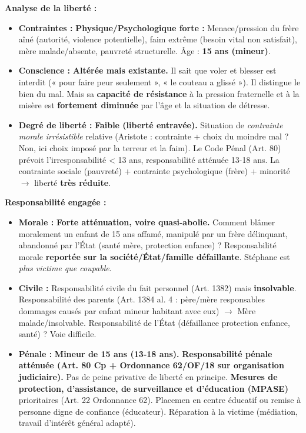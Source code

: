 \documentclass[11pt]{article}
\begin{document}
\begin{exoresolu}
\medskip
\noindent\textbf{Analyse de la liberté :}
\begin{itemize}
    \item \textbf{Contraintes :} \textbf{Physique/Psychologique forte :} Menace/pression du frère aîné (autorité, violence potentielle), faim extrême (besoin vital non satisfait), mère malade/absente, pauvreté structurelle. Âge : \textbf{15 ans (mineur)}.
    \item \textbf{Conscience :} \textbf{Altérée mais existante.} Il sait que voler et blesser est interdit (« pour faire peur seulement », « le couteau a glissé »). Il distingue le bien du mal. Mais sa \textbf{capacité de résistance} à la pression fraternelle et à la misère est \textbf{fortement diminuée} par l'âge et la situation de détresse.
    \item \textbf{Degré de liberté :} \textbf{Faible (liberté entravée).} Situation de \textit{contrainte morale irrésistible} relative (Aristote : contrainte + choix du moindre mal ? Non, ici choix imposé par la terreur et la faim). Le Code Pénal (Art. 80) prévoit l'irresponsabilité < 13 ans, responsabilité atténuée 13-18 ans. La contrainte sociale (pauvreté) + contrainte psychologique (frère) + minorité $\rightarrow$ liberté \textbf{très réduite}.
\end{itemize}

\medskip
\noindent\textbf{Responsabilité engagée :}
\begin{itemize}
    \item \textbf{Morale :} \textbf{Forte atténuation, voire quasi-abolie.} Comment blâmer moralement un enfant de 15 ans affamé, manipulé par un frère délinquant, abandonné par l'État (santé mère, protection enfance) ? Responsabilité morale \textbf{reportée sur la société/État/famille défaillante}. Stéphane est \textit{plus victime que coupable}.
    \item \textbf{Civile :} Responsabilité civile du fait personnel (Art. 1382) mais \textbf{insolvable}. Responsabilité des parents (Art. 1384 al. 4 : père/mère responsables dommages causés par enfant mineur habitant avec eux) $\rightarrow$ Mère malade/insolvable. Responsabilité de l'État (défaillance protection enfance, santé) ? Voie difficile.
    \item \textbf{Pénale :} \textbf{Mineur de 15 ans (13-18 ans).} \textbf{Responsabilité pénale atténuée (Art. 80 Cp + Ordonnance 62/OF/18 sur organisation judiciaire).} Pas de peine privative de liberté en principe. \textbf{Mesures de protection, d'assistance, de surveillance et d'éducation (MPASE)} prioritaires (Art. 22 Ordonnance 62). Placemen en centre éducatif ou remise à personne digne de confiance (éducateur). Réparation à la victime (médiation, travail d'intérêt général adapté).
\end{itemize}


\end{exoresolu}
\end{document}
